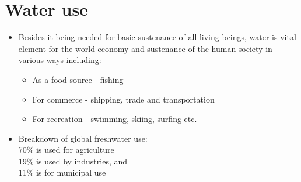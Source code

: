 \section{Water use}
\begin{itemize}
\item Besides it being needed for basic sustenance of all living beings, water is vital element for the world economy and sustenance of the human society in various ways including:
\begin{itemize}
\item As a food source - fishing
\item For commerce - shipping, trade and transportation
\item For recreation - swimming, skiing, surfing etc.
\end{itemize}
\item Breakdown of global freshwater use:\\
70\% is used for agriculture\\
19\% is used by industries, and \\
11\% is for municipal use
\end{itemize}


